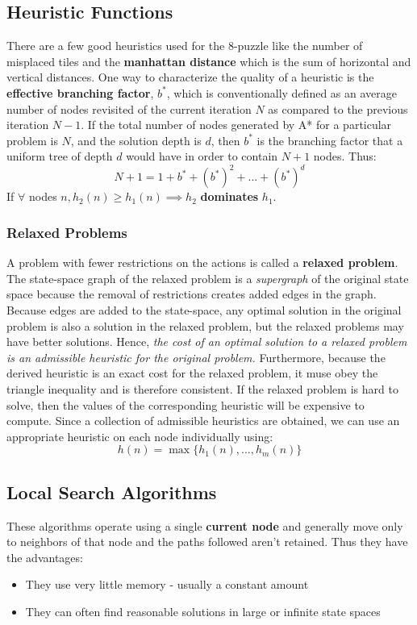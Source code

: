 \documentclass[twoside]{article}
\begin{document}
\subsection{Heuristic Functions}
There are a few good heuristics used for the 8-puzzle like the number of 
misplaced tiles and the \textbf{manhattan distance} which is the sum of 
horizontal and vertical distances. One way to characterize the quality of 
a heuristic is the \textbf{effective branching factor}, \(b^*\), which is 
conventionally defined as an average number of nodes revisited of the current
iteration \(N\) as compared to the previous iteration \(N - 1\). If the total
number of nodes generated by A* for a particular problem is \(N\), and the 
solution depth is \(d\), then \(b^*\) is the branching factor that a uniform
tree of depth \(d\) would have in order to contain \(N + 1\) nodes. Thus:
\begin{equation}
        N + 1 = 1 + b^* + (b^*)^2 + ... + (b^*)^d
\end{equation}
If \(\forall\) nodes \(n, h_2(n) \geq h_1(n) \implies h_2\) \textbf{dominates} \(h_1\).
\subsubsection{Relaxed Problems}
A problem with fewer restrictions on the actions is called a \textbf{relaxed 
problem}. The state-space graph of the relaxed problem is a \emph{supergraph}
of the original state space because the removal of restrictions creates added
edges in the graph. Because edges are added to the state-space, any optimal
solution in the original problem is also a solution in the relaxed problem,
but the relaxed problems may have better solutions. Hence, \emph{the cost of 
an optimal solution to a relaxed problem is an admissible heuristic for the
original problem.} Furthermore, because the derived heuristic is an exact cost
for the relaxed problem, it muse obey the triangle inequality and is therefore 
consistent. If the relaxed problem is hard to solve, then the values of the 
corresponding heuristic will be expensive to compute. Since a collection of 
admissible heuristics are obtained, we can use an appropriate heuristic
on each node individually using:
\begin{equation}
        h(n) = \max\{h_1(n), ... , h_m(n)\}
\end{equation}
\subsection{Local Search Algorithms}
These algorithms operate using a single \textbf{current node} and generally
move only to neighbors of that node and the paths followed aren't retained.
Thus they have the advantages:
\begin{itemize}
        \item They use very little memory - usually a constant amount
        \item They can often find reasonable solutions in large or infinite
                state spaces
\end{itemize}
\end{document}
